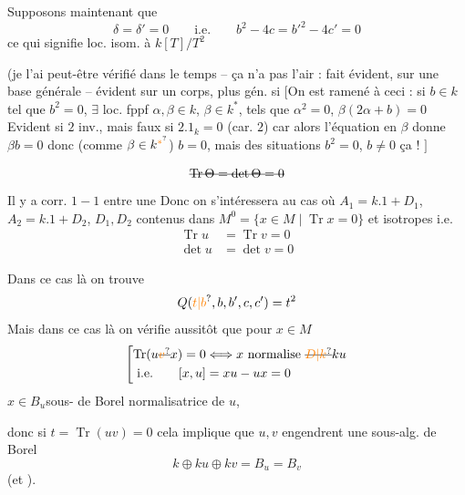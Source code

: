 Supposons maintenant que
\[
\delta=\delta'=0\qquad \text{i.e.}\qquad b^2-4c=b'^2-4c'=0
\]
 ce qui signifie   loc. isom. à $k[T]/T^2$


(je l'ai peut-être vérifié dans le temps -- ça n'a pas l'air  : fait évident, sur une base générale -- évident sur un corps, plus gén. si $\bigl[$On est ramené à ceci : si $b\in k$ tel que $b^2=0$, $\exists$ loc. fppf $\alpha,\beta\in k$, $\beta\in k^*$, tels que $\alpha^2=0$, $\beta(2\alpha+b)=0$ Evident si $2$ inv., mais faux si $2.1_k=0$ (car. $2$) car  alors l'équation en $\beta$ donne $\beta b=0$ donc (comme $\beta\in k^{\unsure{*}}$) $b=0$, mais des situations $b^2=0$, $b\ne0$ ça  ! $\bigr]$

      
\[
\deleted{\operatorname{Tr}\Theta=\det\Theta=0}
\]
 Il y a corr. $1-1$ entre une
Donc on s'intéressera  au cas où $A_1=k.1+D_1$, $A_2=k.1+D_2$, $D_1,D_2$ contenus dans $M^0=\{x\in M\mid\operatorname{Tr}x=0\}$ et isotropes i.e.
\[
\begin{aligned}
\operatorname{Tr}u&=\operatorname{Tr}v=0\\
\det u&=\det v=0
\end{aligned}
\]

Dans ce cas là on trouve
\[
Q(\unsure{t|b},b,b',c,c')=t^2
\]
Mais dans ce cas là on vérifie aussitôt que pour $x\in M$
\[
\left[\begin{aligned}
\operatorname{Tr}(u\deleted{\unsure{v}}x)=0&\Longleftrightarrow x\text{ normalise }\deleted{\unsure{D|k}}ku\\
\text{i.e.}\qquad [x,u]&=xu-ux=0
\end{aligned}\right.
\]
  $x\in B_u$\quad sous- de Borel normalisatrice de $u$,

donc si $t=\operatorname{Tr}(uv)=0$ cela implique que $u,v$ engendrent  une sous-alg. de Borel
\[
k\oplus ku\oplus kv=B_u=B_v
\]
(et ).

